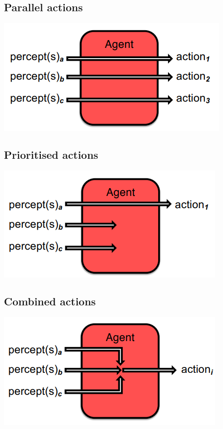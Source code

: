 \documentclass{article}
\begin{document}
\begin{multicols}{2}

\subsection{Parallel actions}

\includegraphics[scale=0.5]{paralel_actions.png}

\subsection{Prioritised actions}

\includegraphics[scale=0.5]{prioritised_actions.png}

\subsection{Combined actions}

\includegraphics[scale=0.5]{combined_actions.png}

\end{multicols}
\end{document}

